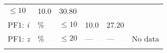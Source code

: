 \documentclass[DM,lsstdraft,toc]{lsstdoc}
\begin{document}
\begin{longtable}[]{@{}llllll@{}}
\begin{minipage}[t]{0.17\columnwidth}
\(\leq 10\)\strut
\end{minipage} & \begin{minipage}[t]{0.17\columnwidth}\raggedright\strut
10.0\strut
\end{minipage} & \begin{minipage}[t]{0.12\columnwidth}\raggedright\strut
30.80\strut
\end{minipage} & \begin{minipage}[t]{0.17\columnwidth}\raggedright\strut
\strut
\end{minipage}\tabularnewline
\begin{minipage}[t]{0.14\columnwidth}\raggedright\strut
PF1: \emph{i}\strut
\end{minipage} & \begin{minipage}[t]{0.06\columnwidth}\raggedright\strut
\%\strut
\end{minipage} & \begin{minipage}[t]{0.17\columnwidth}\raggedright\strut
\(\leq 10\)\strut
\end{minipage} & \begin{minipage}[t]{0.17\columnwidth}\raggedright\strut
10.0\strut
\end{minipage} & \begin{minipage}[t]{0.12\columnwidth}\raggedright\strut
27.20\strut
\end{minipage} & \begin{minipage}[t]{0.17\columnwidth}\raggedright\strut
\strut
\end{minipage}\tabularnewline
\begin{minipage}[t]{0.14\columnwidth}\raggedright\strut
PF1: \emph{z}\strut
\end{minipage} & \begin{minipage}[t]{0.06\columnwidth}\raggedright\strut
\%\strut
\end{minipage} & \begin{minipage}[t]{0.17\columnwidth}\raggedright\strut
\(\leq 20\)\strut
\end{minipage} & \begin{minipage}[t]{0.17\columnwidth}\raggedright\strut
---\strut
\end{minipage} & \begin{minipage}[t]{0.12\columnwidth}\raggedright\strut
---\strut
\end{minipage} & \begin{minipage}[t]{0.17\columnwidth}\raggedright\strut
No data\strut
\end{minipage}\tabularnewline
\begin{minipage}[t]{0.14\columnwidth}\raggedright\strut

\end{minipage}
\end{longtable}
\end{document}
